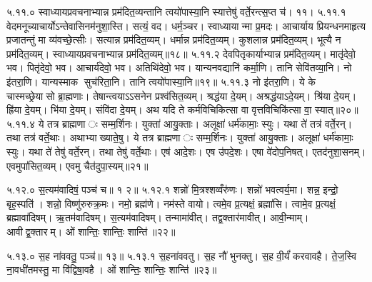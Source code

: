 ५.११.०
स्वाध्यायप्रवचनाभ्यान्न प्रम॑दित॒व्यन्तानि त्वयो॑पास्या॒नि स्यात्तेषु॑ वर्ते॒रन्त्स॒प्त च॑। ११।
५.११.१
वेदमनूच्याचार्योऽन्तेवासिनम॑नुशा॒स्ति। सत्यं॒ वद। धर्म॒ञ्चर। स्वाध्यायान्मा प्र॒मदः। आचार्याय प्रियन्धनमाहृत्य प्रजातन्तुं मा व्य॑वच्छे॒त्सीः। सत्यान्न प्रम॑दित॒व्यम्। धर्मान्न प्रम॑दित॒व्यम्। कुशलान्न प्रम॑दित॒व्यम्। भूत्यै न प्रम॑दित॒व्यम्। स्वाध्यायप्रवचनाभ्यान्न प्रम॑दित॒व्यम्॥१८॥
५.११.२
देवपितृकार्याभ्यान्न प्रम॑दित॒व्यम्। मातृ॑देवो॒ भव। पितृ॑देवो॒ भव। आचार्य॑देवो॒ भव। अतिथि॑देवो॒ भव। यान्यनवद्यानि॑ कर्मा॒णि। तानि सेवि॑तव्या॒नि। नो इ॑तरा॒णि। यान्यस्माक सुच॑रिता॒नि। तानि त्वयो॑पास्या॒नि॥१९॥
५.११.३
नो इ॑तरा॒णि। ये के चास्मच्छ्रेयासो ब्रा॒ह्मणाः। तेषान्त्वयाऽऽसनेन प्रश्व॑सित॒व्यम्। श्रद्ध॑या दे॒यम्। अश्रद्ध॑याऽदे॒यम्। श्रि॑या दे॒यम्। ह्रि॑या दे॒यम्। भि॑या दे॒यम्। संवि॑दा दे॒यम्। अथ यदि ते कर्मविचिकित्सा वा वृत्तविचिकि॑त्सा वा॒ स्यात्॥२०॥
५.११.४
ये तत्र ब्राह्मणाः सम्म॒र्\mbox{}शिनः। युक्ता॑ आयु॒क्ताः। अलूक्षा॑ धर्म॑कामाः॒ स्युः। यथा ते॑ तत्र॑ वर्ते॒रन्। तथा तत्र॑ वर्ते॒थाः। अथाभ्याख्याते॒षु। ये तत्र ब्राह्मणाः सम्म॒र्\mbox{}शिनः। युक्ता॑ आयु॒क्ताः। अलूक्षा॑ धर्म॑कामाः॒ स्युः। यथा ते॑ तेषु॑ वर्ते॒रन्। तथा तेषु॑ वर्ते॒थाः। एष॑ आदे॒शः। एष उ॑पदे॒शः। एषा वे॑दोप॒निषत्। एतद॑नुशा॒सनम्। एवमुपा॑सित॒व्यम्। एवमु चैत॑दुपा॒स्यम्॥२१॥
\anuvakamend

५.१२.०
स॒त्यम॑वादिषं॒ पञ्च॑ च॥ १ २॥
५.१२.१
शन्नो॑ मि॒त्रश्शव्वँरु॑णः। शन्नो॑ भवत्वर्य॒मा। शन्न॒ इन्द्रो॒ बृह॒स्पति॑। शन्नो॒ विष्णु॑रुरुक्र॒मः। नमो॒ ब्रह्म॑णे। नम॑स्ते वायो। त्वमे॒व प्र॒त्यक्षं॒ ब्रह्मा॑सि। त्वामे॒व प्र॒त्यक्षं॒ ब्रह्मावा॑दिषम्। ऋ॒तम॑वादिषम्। स॒त्यम॑वादिषम्। तन्मामा॑वीत्। तद्व॒क्तार॑मावीत्। आवी॒न्माम्। आवीद्व॒क्तारम्। ओं शान्तिः॒ शान्तिः॒ शान्ति॑॥२२॥

\setcounter{anuvakam}{0}
५.१३.०
स॒ह ना॑ववतु॒ पञ्च॑॥ १३॥
५.१३.१
स॒हना॑ववतु। स॒ह नौ॑ भुनक्तु। स॒ह वी॒र्यं॑ करवावहै। ते॒ज॒स्वि ना॒वधी॑तमस्तु॒ मा वि॑द्विषा॒वहै। ओं शान्तिः॒ शान्तिः॒ शान्ति॑॥२३॥
\anuvakamend

